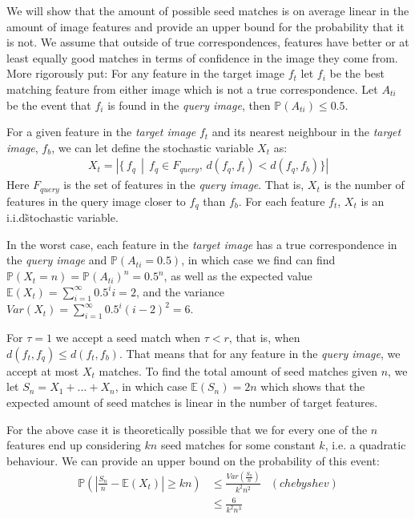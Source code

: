 \documentclass[runningheads]{llncs}
\begin{document}
We will show that the amount of possible seed matches is on average linear in the amount of image features and provide an upper bound for the probability that it is not. We assume that outside of true correspondences, features have better or at least equally good matches in terms of confidence in the image they come from. More rigorously put: For any feature in the target image $f_t$ let $f_i$ be the best matching feature from either image which is not a true correspondence. Let $A_{ti}$ be the event that $f_i$ is found in the \emph{query image}, then $\mathbb{P}(A_{ti}) \leq 0.5$.

For a given feature in the \emph{target image} $f_t$ and its nearest neighbour in the \emph{target image}, $f_b$, we can let define the stochastic variable $X_t$ as:
\begin{align}
    X_t = \left| \{ \, f_q \, \middle| \, f_q \in F_{query},\, d(f_q, f_t) < d(f_q, f_b) \} \right|
\end{align}
Here $F_{query}$ is the set of features in the \emph{query image}. That is, $X_t$ is the number of features in the query image closer to $f_q$ than $f_b$. For each feature $f_t$, $X_t$ is an i.i.d\~stochastic variable. 

In the worst case, each feature in the \emph{target image} has a true correspondence in the \emph{query image} and $\mathbb{P}(A_{ti} = 0.5)$, in which case we find can find $\mathbb{P}(X_t = n) = \mathbb{P}(A_{ti})^n = 0.5^n$, as well as the expected value $\mathbb{E}(X_t) = \sum_{i=1}^\infty 0.5^ii = 2$, and the variance $Var(X_t) = \sum_{i=1}^\infty 0.5^i(i - 2)^2 = 6$.

For $\tau = 1$ we accept a seed match when $\tau < r$, that is, when $d(f_t, f_q) \leq d(f_t, f_b)$. That means that for any feature in the \emph{query image}, we accept at most $X_t$ matches. To find the total amount of seed matches given $n$, we let $S_n = X_1 + \ldots + X_n$, in which case $\mathbb{E}(S_n) = 2n$ which shows that the expected amount of seed matches is linear in the number of target features. 

For the above case it is theoretically possible that we for every one of the $n$ features end up considering $kn$ seed matches for some constant $k$, i.e. a quadratic behaviour. We can provide an upper bound on the probability of this event:
\begin{align}
    \label{bound}
    \mathbb{P}\left(\left| \frac{S_n}{n} - \mathbb{E}(X_t) \right| \ge kn\right) &\le \frac{Var\left(\frac{S_n}{n}\right)}{k^2n^2} & (chebyshev)\\
&\le \frac{6}{k^2n^3}
\end{align}
\end{document}
